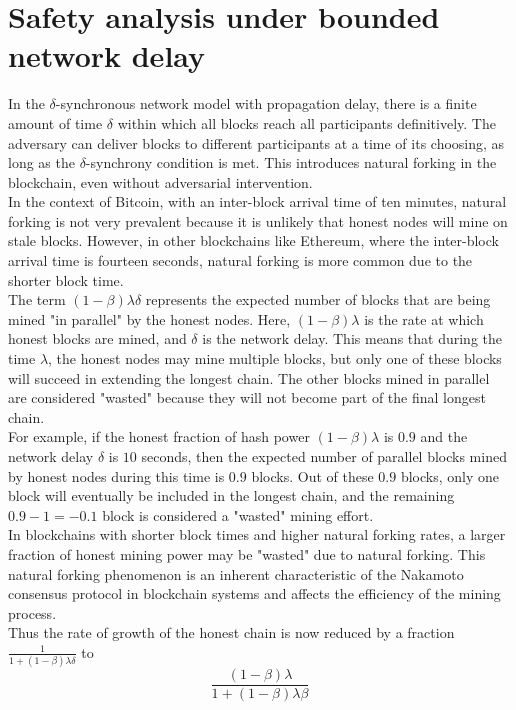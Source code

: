 \section{Safety analysis under bounded network delay}
In the $\delta$-synchronous network model with propagation delay, there is a finite amount of time $\delta$ within which all blocks reach all participants definitively. The adversary can deliver blocks to different participants at a time of its choosing, as long as the $\delta$-synchrony condition is met. This introduces natural forking in the blockchain, even without adversarial intervention.\\
In the context of Bitcoin, with an inter-block arrival time of ten minutes, natural forking is not very prevalent because it is unlikely that honest nodes will mine on stale blocks. However, in other blockchains like Ethereum, where the inter-block arrival time is fourteen seconds, natural forking is more common due to the shorter block time.\\
The term $(1 - \beta)\lambda\delta$ represents the expected number of blocks that are being mined "in parallel" by the honest nodes. Here, $(1 - \beta)\lambda$ is the rate at which honest blocks are mined, and $\delta$ is the network delay. This means that during the time $\lambda$, the honest nodes may mine multiple blocks, but only one of these blocks will succeed in extending the longest chain. The other blocks mined in parallel are considered "wasted" because they will not become part of the final longest chain.\\
For example, if the honest fraction of hash power $(1 - \beta)\lambda$ is $0.9$ and the network delay $\delta$ is $10$ seconds, then the expected number of parallel blocks mined by honest nodes during this time is $0.9$ blocks. Out of these $0.9$ blocks, only one block will eventually be included in the longest chain, and the remaining $0.9 - 1 = -0.1$ block is considered a "wasted" mining effort.\\
In blockchains with shorter block times and higher natural forking rates, a larger fraction of honest mining power may be "wasted" due to natural forking. This natural forking phenomenon is an inherent characteristic of the Nakamoto consensus protocol in blockchain systems and affects the efficiency of the mining process.\\
Thus the rate of growth of the honest chain is now reduced by a fraction $\frac{1}{1+(1 - \beta)\lambda\delta}$ to
\begin{equation*}
    \frac{(1 - \beta) \lambda}{1 + (1 - \beta) \lambda \beta}
\end{equation*}
